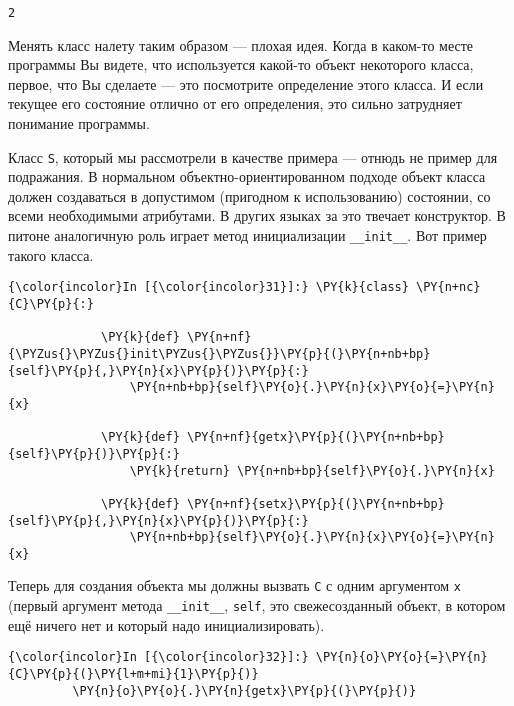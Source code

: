     \begin{Verbatim}[commandchars=\\\{\}]
2

    \end{Verbatim}

    Менять класс налету таким образом --- плохая идея. Когда в каком-то месте
программы Вы видете, что используется какой-то объект некоторого класса,
первое, что Вы сделаете --- это посмотрите определение этого класса. И
если текущее его состояние отлично от его определения, это сильно
затрудняет понимание программы.

Класс \texttt{S}, который мы рассмотрели в качестве примера --- отнюдь не
пример для подражания. В нормальном объектно-ориентированном подходе
объект класса должен создаваться в допустимом (пригодном к
использованию) состоянии, со всеми необходимыми атрибутами. В других
языках за это твечает конструктор. В питоне аналогичную роль играет
метод инициализации \texttt{\_\_init\_\_}. Вот пример такого класса.

    \begin{Verbatim}[commandchars=\\\{\}]
{\color{incolor}In [{\color{incolor}31}]:} \PY{k}{class} \PY{n+nc}{C}\PY{p}{:}
             
             \PY{k}{def} \PY{n+nf}{\PYZus{}\PYZus{}init\PYZus{}\PYZus{}}\PY{p}{(}\PY{n+nb+bp}{self}\PY{p}{,}\PY{n}{x}\PY{p}{)}\PY{p}{:}
                 \PY{n+nb+bp}{self}\PY{o}{.}\PY{n}{x}\PY{o}{=}\PY{n}{x}
                 
             \PY{k}{def} \PY{n+nf}{getx}\PY{p}{(}\PY{n+nb+bp}{self}\PY{p}{)}\PY{p}{:}
                 \PY{k}{return} \PY{n+nb+bp}{self}\PY{o}{.}\PY{n}{x}
             
             \PY{k}{def} \PY{n+nf}{setx}\PY{p}{(}\PY{n+nb+bp}{self}\PY{p}{,}\PY{n}{x}\PY{p}{)}\PY{p}{:}
                 \PY{n+nb+bp}{self}\PY{o}{.}\PY{n}{x}\PY{o}{=}\PY{n}{x}
\end{Verbatim}

    Теперь для создания объекта мы должны вызвать \texttt{C} с одним
аргументом \texttt{x} (первый аргумент метода \texttt{\_\_init\_\_},
\texttt{self}, это свежесозданный объект, в котором ещё ничего нет и
который надо инициализировать).

    \begin{Verbatim}[commandchars=\\\{\}]
{\color{incolor}In [{\color{incolor}32}]:} \PY{n}{o}\PY{o}{=}\PY{n}{C}\PY{p}{(}\PY{l+m+mi}{1}\PY{p}{)}
         \PY{n}{o}\PY{o}{.}\PY{n}{getx}\PY{p}{(}\PY{p}{)}
\end{Verbatim}

